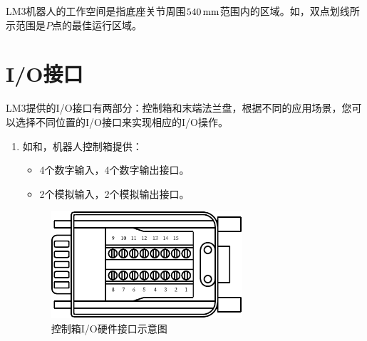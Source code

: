 LM3机器人的工作空间是指底座关节周围$540\,\mathrm{mm}$范围内的区域。如，双点划线所示范围是$\!P\!$点的最佳运行区域。

\clearpage

\section{I/O接口}

LM3提供的I/O接口有两部分：控制箱和末端法兰盘，根据不同的应用场景，您可以选择不同位置的I/O接口来实现相应的I/O操作。


\begin{enumerate}
    \item 如和，机器人控制箱提供：
    \begin{itemize}
        \item 4个数字输入，4个数字输出接口。
        \item 2个模拟输入，2个模拟输出接口。
    \end{itemize}

\begin{figure}[htb!]
    \centering
    \includegraphics[height=4cm]{line_graphs/robot_box_io_plugin.pdf}
    \caption{控制箱I/O硬件接口示意图}
    \label{fig:控制箱IO}
\end{figure}




\end{enumerate}
